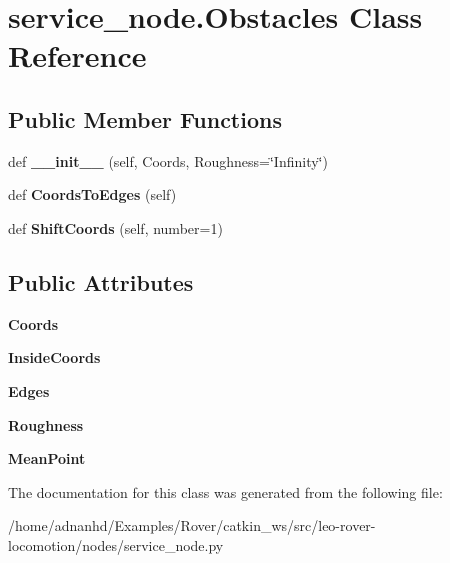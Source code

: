 \hypertarget{classservice__node_1_1Obstacles}{}\section{service\+\_\+node.\+Obstacles Class Reference}
\label{classservice__node_1_1Obstacles}
\subsection*{Public Member Functions}
\begin{DoxyCompactItemize}
\item 
\mbox{\label{classservice__node_1_1Obstacles_a2f33d16e3ac2077b687b0b56454c8191}} 
def {\bfseries \+\_\+\+\_\+init\+\_\+\+\_\+} (self, Coords, Roughness=\char`\"{}Infinity\char`\"{})
\item 
\mbox{\label{classservice__node_1_1Obstacles_af14f89140ef56231b8b0881bb7b7fb23}} 
def {\bfseries Coords\+To\+Edges} (self)
\item 
\mbox{\label{classservice__node_1_1Obstacles_a7866d05a8e1cd73375ee930f7030a396}} 
def {\bfseries Shift\+Coords} (self, number=1)
\end{DoxyCompactItemize}
\subsection*{Public Attributes}
\begin{DoxyCompactItemize}
\item 
\mbox{\label{classservice__node_1_1Obstacles_a713a76ee63e93c239c4ac41864373c5b}} 
{\bfseries Coords}
\item 
\mbox{\label{classservice__node_1_1Obstacles_a995b12d47021030dc73c4e43b0a0256d}} 
{\bfseries Inside\+Coords}
\item 
\mbox{\label{classservice__node_1_1Obstacles_af43619ddb736e70cead868421e8e5f26}} 
{\bfseries Edges}
\item 
\mbox{\label{classservice__node_1_1Obstacles_a8708c47edd27c1bb76b4baa7488814de}} 
{\bfseries Roughness}
\item 
\mbox{\label{classservice__node_1_1Obstacles_aaab9b067afbb4a66cf3438454d333290}} 
{\bfseries Mean\+Point}
\end{DoxyCompactItemize}


The documentation for this class was generated from the following file\+:\begin{DoxyCompactItemize}
\item 
/home/adnanhd/\+Examples/\+Rover/catkin\+\_\+ws/src/leo-\/rover-\/locomotion/nodes/service\+\_\+node.\+py\end{DoxyCompactItemize}

